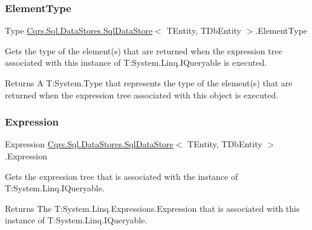\subsubsection{\texorpdfstring{Element\+Type}{ElementType}}
{\footnotesize\ttfamily Type \hyperlink{classCqrs_1_1Sql_1_1DataStores_1_1SqlDataStore}{Cqrs.\+Sql.\+Data\+Stores.\+Sql\+Data\+Store}$<$ T\+Entity, T\+Db\+Entity $>$.Element\+Type\hspace{0.3cm}{\ttfamily [get]}}



Gets the type of the element(s) that are returned when the expression tree associated with this instance of T\+:\+System.\+Linq.\+I\+Queryable is executed. 

\begin{DoxyReturn}{Returns}
A T\+:\+System.\+Type that represents the type of the element(s) that are returned when the expression tree associated with this object is executed. 
\end{DoxyReturn}
\mbox{\label{classCqrs_1_1Sql_1_1DataStores_1_1SqlDataStore_a821c821912482862e0b6143a3125e2e1_a821c821912482862e0b6143a3125e2e1}} 
\subsubsection{\texorpdfstring{Expression}{Expression}}
{\footnotesize\ttfamily Expression \hyperlink{classCqrs_1_1Sql_1_1DataStores_1_1SqlDataStore}{Cqrs.\+Sql.\+Data\+Stores.\+Sql\+Data\+Store}$<$ T\+Entity, T\+Db\+Entity $>$.Expression\hspace{0.3cm}{\ttfamily [get]}}



Gets the expression tree that is associated with the instance of T\+:\+System.\+Linq.\+I\+Queryable. 

\begin{DoxyReturn}{Returns}
The T\+:\+System.\+Linq.\+Expressions.\+Expression that is associated with this instance of T\+:\+System.\+Linq.\+I\+Queryable. 
\end{DoxyReturn}
\mbox{\label{classCqrs_1_1Sql_1_1DataStores_1_1SqlDataStore_af732efd5901590c769e2ace2a4f4f913_af732efd5901590c769e2ace2a4f4f913}} 
